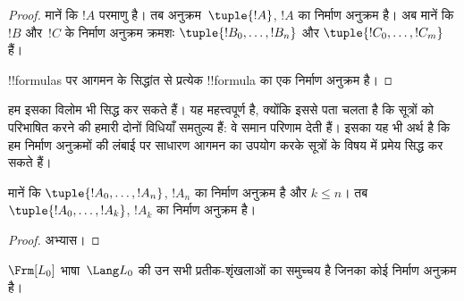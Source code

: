 \documentclass[../../../include/open-logic-section]{subfiles}
\begin{document}
\begin{proof}
मानें कि $!A$ परमाणु है। तब अनुक्रम~$\tuple{!A}$, $!A$ का निर्माण अनुक्रम है।
%
अब मानें कि $!B$ और~$!C$ के निर्माण अनुक्रम क्रमशः
$\tuple{!B_0,\dotsc,!B_n}$ और $\tuple{!C_0,\dotsc,!C_m}$ हैं।
%
\begin{enumerate}
\end{enumerate}
!!{formula}s पर आगमन के सिद्धांत से प्रत्येक !!{formula} का एक निर्माण
अनुक्रम है।
\end{proof}

हम इसका विलोम भी सिद्ध कर सकते हैं। यह महत्त्वपूर्ण है, क्योंकि इससे पता चलता
है कि सूत्रों को परिभाषित करने की हमारी दोनों विधियाँ समतुल्य हैं: वे समान
परिणाम देती हैं। इसका यह भी अर्थ है कि हम निर्माण अनुक्रमों की लंबाई पर साधारण
आगमन का उपयोग करके सूत्रों के विषय में प्रमेय सिद्ध कर सकते हैं।

\begin{lem}
मानें कि $\tuple{!A_0,\dotsc,!A_n}$, $!A_n$ का निर्माण अनुक्रम है और
$k \leq n$। तब $\tuple{!A_0,\dotsc,!A_k}$, $!A_k$ का निर्माण अनुक्रम है।
\end{lem}

\begin{proof}
अभ्यास।
\end{proof}

\begin{thm}
$\Frm[L_0]$ भाषा~$\Lang L_0$ की उन सभी प्रतीक-शृंखलाओं का समुच्चय है
जिनका कोई निर्माण अनुक्रम है।
\end{thm}
\end{document}
